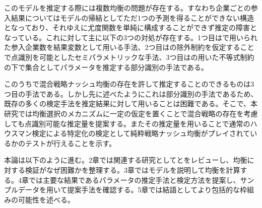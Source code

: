 このモデルを推定する際には複数均衡の問題が存在する。すなわち企業ごとの参入結果についてはモデルの帰結としてただ1つの予測を得ることができない構造となっており、それゆえに尤度関数を単純に構成することができず推定の障害となっている。これに対して主に以下の3つの対処が存在する。1つ目は\cite{Bresnahan1991}で用いられた参入企業数を結果変数として用いる手法、2つ目は\cite{Tamer2003a}の除外制約を仮定することで点識別を可能としたセミパラメトリックな手法、3つ目は\cite{Ciliberto2009a}の用いた不等式制約の下で集合としてパラメータを推定する部分識別の手法である。

このうちで混合戦略ナッシュ均衡の存在を許して推定することのできるものは3つ目の手法である。しかし先に述べたようにこれは部分識別の手法であるため、既存の多くの検定手法を推定結果に対して用いることは困難である。そこで、本研究では均衡選択のメカニズムに一定の仮定を置くことで混合戦略の存在を考慮しても点識別可能な推定量を提案する。またその推定量を用いることで通常のハウスマン検定による特定化の検定として純粋戦略ナッシュ均衡がプレイされているかのテストが行えることを示す。

本論は以下のように進む。2章では関連する研究として\cite{Ostling2011}と\cite{Chiappori2002}をレビューし、均衡に対する検証がなぜ困難かを整理する。3章ではモデルを説明して均衡を計算する。4章では主要な結果であるパラメータの推定手法と検定方法を提案し、サンプルデータを用いて提案手法を確認する。5章では結語としてより包括的な枠組みの可能性を述べる。